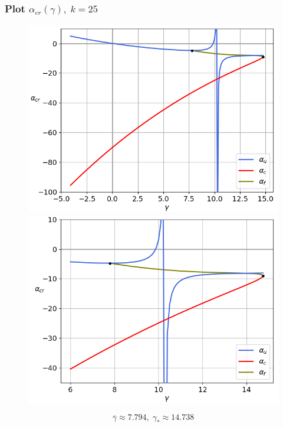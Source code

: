 \documentclass[fullscreen=true, unicode, bookmarks=false]{beamer}
\begin{document}
\begin{frame}
\frametitle{ Plot $ \alpha_{cr}(\gamma), \; k = 25 $ }

\begin{figure} 
\begin{minipage}[h]{0.49\linewidth}
\begin{center}
\includegraphics[scale=0.37]{alphas_049.png} 
\end{center}
\end{minipage} 
\hfill
\begin{minipage}[h]{0.49\linewidth}
\begin{center}
\includegraphics[scale=0.37]{alphas_intersection_049.png}
\end{center}
\end{minipage} 
\end{figure}

$$ \overline{\gamma} \approx 7.794, \; \gamma_* \approx 14.738 $$

\end{frame}
\end{document}
